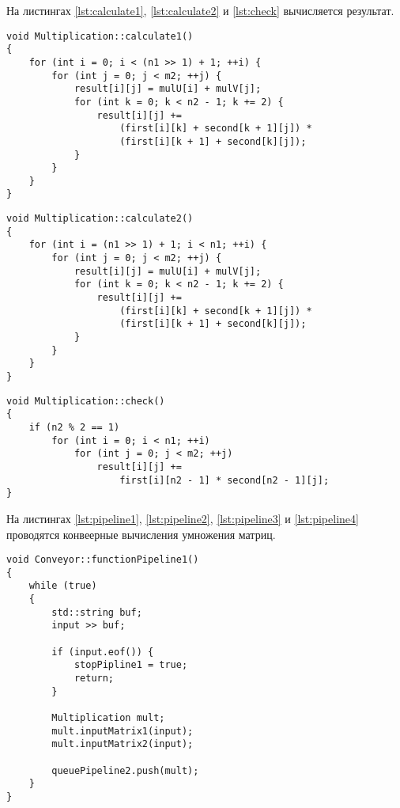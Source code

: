На листингах \ref{lst:calculate1}, \ref{lst:calculate2} и \ref{lst:check} вычисляется
результат.

\begin{lstlisting}[caption=Подсчет первой половины результата,label=lst:calculate1]
void Multiplication::calculate1()
{
    for (int i = 0; i < (n1 >> 1) + 1; ++i) {
        for (int j = 0; j < m2; ++j) {
            result[i][j] = mulU[i] + mulV[j];
            for (int k = 0; k < n2 - 1; k += 2) {
                result[i][j] +=
                    (first[i][k] + second[k + 1][j]) *
                    (first[i][k + 1] + second[k][j]);
            }
        }
    }
}
\end{lstlisting}

\begin{lstlisting}[caption=Подсчет второй половины результата,label=lst:calculate2]
void Multiplication::calculate2()
{
    for (int i = (n1 >> 1) + 1; i < n1; ++i) {
        for (int j = 0; j < m2; ++j) {
            result[i][j] = mulU[i] + mulV[j];
            for (int k = 0; k < n2 - 1; k += 2) {
                result[i][j] +=
                    (first[i][k] + second[k + 1][j]) *
                    (first[i][k + 1] + second[k][j]);
            }
        }
    }
}
\end{lstlisting}

\begin{lstlisting}[caption=Проверка на нечетность и вычисление если необходимо,label=lst:check]
void Multiplication::check()
{
    if (n2 % 2 == 1)
        for (int i = 0; i < n1; ++i)
            for (int j = 0; j < m2; ++j)
                result[i][j] +=
                    first[i][n2 - 1] * second[n2 - 1][j];
}
\end{lstlisting}

На листингах \ref{lst:pipeline1}, \ref{lst:pipeline2}, \ref{lst:pipeline3} и
\ref{lst:pipeline4} проводятся конвеерные вычисления умножения матриц.

\begin{lstlisting}[caption=Первый конвейер,label=lst:pipeline1]
void Conveyor::functionPipeline1()
{
    while (true)
    {
        std::string buf;
        input >> buf;

        if (input.eof()) {
            stopPipline1 = true;
            return;
        }

        Multiplication mult;
        mult.inputMatrix1(input);
        mult.inputMatrix2(input);

        queuePipeline2.push(mult);
    }
}
\end{lstlisting}

